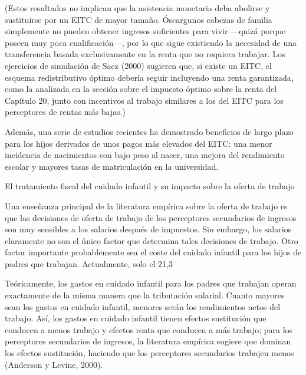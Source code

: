\documentclass[10pt,a4paper]{article}
\begin{document}
(Estos resultados no implican que la asistencia monetaria deba abolirse y sustituirse por un EITC de mayor tamaño. Óscargunos cabezas de familia simplemente no pueden obtener ingresos suficientes para vivir —quizá porque poseen muy poca cualificación—, por lo que sigue existiendo la necesidad de una transferencia basada exclusivamente en la renta que no requiera trabajar. Los ejercicios de simulación de Saez (2000) sugieren que, si existe un EITC, el esquema redistributivo óptimo debería seguir incluyendo una renta garantizada, como la analizada en la sección sobre el impuesto óptimo sobre la renta del Capítulo 20, junto con incentivos al trabajo similares a los del EITC para los perceptores de rentas más bajas.)

Además, una serie de estudios recientes ha demostrado beneficios de largo plazo para los hijos derivados de unos pagos más elevados del EITC: una menor incidencia de nacimientos con bajo peso al nacer, una mejora del rendimiento escolar y mayores tasas de matriculación en la universidad.

El tratamiento fiscal del cuidado infantil y su impacto sobre la oferta de trabajo

Una enseñanza principal de la literatura empírica sobre la oferta de trabajo es que las decisiones de oferta de trabajo de los perceptores secundarios de ingresos son muy sensibles a los salarios después de impuestos. Sin embargo, los salarios claramente no son el único factor que determina tales decisiones de trabajo. Otro factor importante probablemente sea el coste del cuidado infantil para los hijos de padres que trabajan. Actualmente, solo el 21,3 %

Teóricamente, los gastos en cuidado infantil para los padres que trabajan operan exactamente de la misma manera que la tributación salarial. Cuanto mayores sean los gastos en cuidado infantil, menores serán los rendimientos netos del trabajo. Así, los gastos en cuidado infantil tienen efectos sustitución que conducen a menos trabajo y efectos renta que conducen a más trabajo; para los perceptores secundarios de ingresos, la literatura empírica sugiere que dominan los efectos sustitución, haciendo que los perceptores secundarios trabajen menos (Anderson y Levine, 2000).
\end{document}
